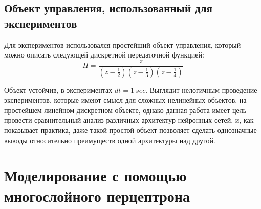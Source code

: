 \documentclass[12pt, oneside]{extbook}
\begin{document}
\begin{flushleft}
\section{Объект управления, использованный для экспериментов}
Для экспериментов использовался простейший объект управления, который можно описать следующей дискретной передаточной функцией:\\
\begin{equation} \label{eq:1}
H = \frac{z}{(z-\frac{1}{2})(z-\frac{1}{3})(z-\frac{1}{4})}
\end{equation}
\par
Объект устойчив, в экспериментах $dt = 1~sec$. Выглядит нелогичным проведение экспериментов, которые имеют смысл для сложных нелинейных объектов, на простейшем линейном дискретном объекте, однако данная работа имеет цель провести сравнительный анализ различных архитектур нейронных сетей, и, как показывает практика, даже такой простой объект позволяет сделать однозначные выводы относительно преимуществ одной архитектуры над другой.
\chapter{Моделирование с помощью многослойного перцептрона}

\end{flushleft}
\end{document}
